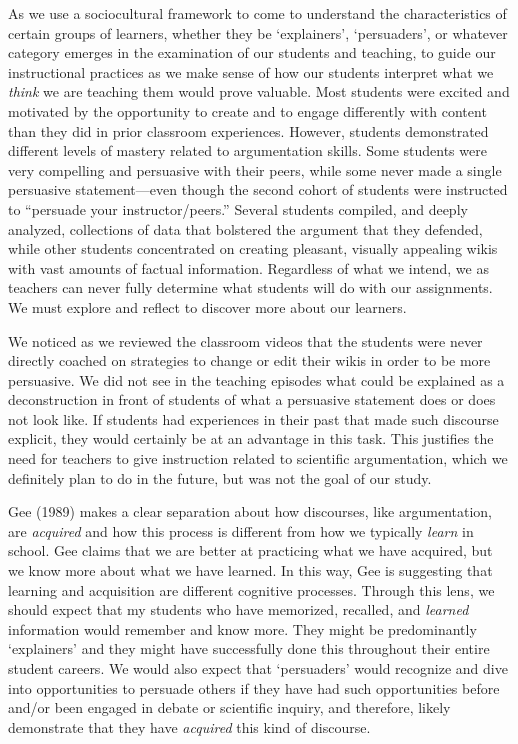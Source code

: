 \documentclass[11.5pt]{sig-alternate} %
\begin{document}
\begin{large}
As we use a sociocultural framework to come to understand the characteristics of certain groups of learners, whether they be ‘explainers’, ‘persuaders’, or whatever category emerges in the examination of our students and teaching, to guide our instructional practices as we make sense of how our students interpret what we \textit{think} we are teaching them would prove valuable. Most students were excited and motivated by the opportunity to create and to engage differently with content than they did in prior classroom experiences. However, students demonstrated different levels of mastery related to argumentation skills. Some students were very compelling and persuasive with their peers, while some never made a single persuasive statement—even though the second cohort of students were instructed to “persuade your instructor/peers.” Several students compiled, and deeply analyzed, collections of data that bolstered the argument that they defended, while other students concentrated on creating pleasant, visually appealing wikis with vast amounts of factual information. Regardless of what we intend, we as teachers can never fully determine what students will do with our assignments. We must explore and reflect to discover more about our learners. 

We noticed as we reviewed the classroom videos that the students were never directly coached on strategies to change or edit their wikis in order to be more persuasive. We did not see in the teaching episodes what could be explained as a deconstruction in front of students of what a persuasive statement does or does not look like. If students had experiences in their past that made such discourse explicit, they would certainly be at an advantage in this task. This justifies the need for teachers to give instruction related to scientific argumentation, which we definitely plan to do in the future, but was not the goal of our study. 

Gee (1989) makes a clear separation about how discourses, like argumentation, are \textit{acquired} and how this process is different from how we typically \textit{learn} in school. Gee claims that we are better at practicing what we have acquired, but we know more about what we have learned. In this way, Gee is suggesting that learning and acquisition are different cognitive processes. Through this lens, we should expect that my students who have memorized, recalled, and \textit{learned} information would remember and know more. They might be predominantly ‘explainers’ and they might have successfully done this throughout their entire student careers. We would also expect that ‘persuaders’ would recognize and dive into opportunities to persuade others if they have had such opportunities before and/or been engaged in debate or scientific inquiry, and therefore, likely demonstrate that they have \textit{acquired} this kind of discourse. 


\end{large}
\end{document}
